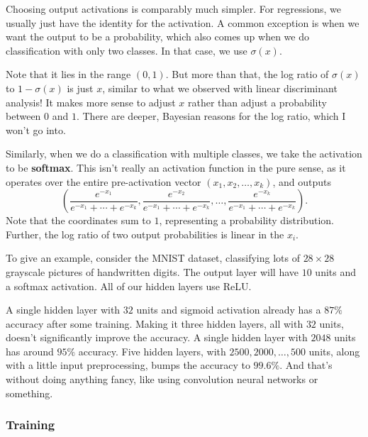 \documentclass[11pt,paper=letter]{scrartcl}
\begin{document}
Choosing output activations is comparably much simpler. For regressions, we usually just have the identity for the activation. A common exception is when we want the output to be a probability, which also comes up when we do classification with only two classes. In that case, we use $\sigma(x)$.

Note that it lies in the range $(0, 1)$. But more than that, the log ratio of $\sigma(x)$ to $1 - \sigma(x)$ is just $x$, similar to what we observed with linear discriminant analysis! It makes more sense to adjust $x$ rather than adjust a probability between $0$ and $1$. There are deeper, Bayesian reasons for the log ratio, which I won't go into.

Similarly, when we do a classification with multiple classes, we take the activation to be \textbf{softmax}. This isn't really an activation function in the pure sense, as it operates over the entire pre-activation vector $(x_1, x_2, \ldots, x_k)$, and outputs \[
  \left(\dfrac{e^{-x_1}}{e^{-x_1} + \cdots + e^{-x_k}}, \dfrac{e^{-x_2}}{e^{-x_1} + \cdots + e^{-x_k}}, \ldots, \dfrac{e^{-x_k}}{e^{-x_1} + \cdots + e^{-x_k}}\right).
\]
Note that the coordinates sum to $1$, representing a probability distribution. Further, the log ratio of two output probabilities is linear in the $x_i$.

To give an example, consider the MNIST dataset, classifying lots of $28 \times 28$ grayscale pictures of handwritten digits. The output layer will have $10$ units and a softmax activation. All of our hidden layers use ReLU.

A single hidden layer with $32$ units and sigmoid activation already has a $87\%$ accuracy after some training. Making it three hidden layers, all with $32$ units, doesn't significantly improve the accuracy. A single hidden layer with $2048$ units has around $95\%$ accuracy. Five hidden layers, with $2500, 2000, \ldots, 500$ units, along with a little input preprocessing, bumps the accuracy to $99.6\%$. And that's without doing anything fancy, like using convolution neural networks or something.

\subsubsection*{Training}
\end{document}
